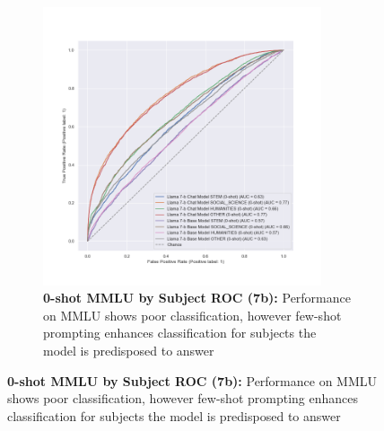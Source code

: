 \documentclass[11pt]{article}
\begin{document}
\begin{figure}
\begin{subfigure}[b]{0.38\textwidth}
         \centering \includegraphics[width=0.9\textwidth]{figures/0-shot-MMLU-subjects-7b-roc.png}
         \caption{\textbf{0-shot MMLU by Subject ROC (7b):} Performance on MMLU shows poor classification, however few-shot prompting enhances classification for subjects the model is predisposed to answer}
         \label{fig:0-shot-MMLU-subjects-7b-roc}
    \end{subfigure}
    

\end{figure}
\end{document}
